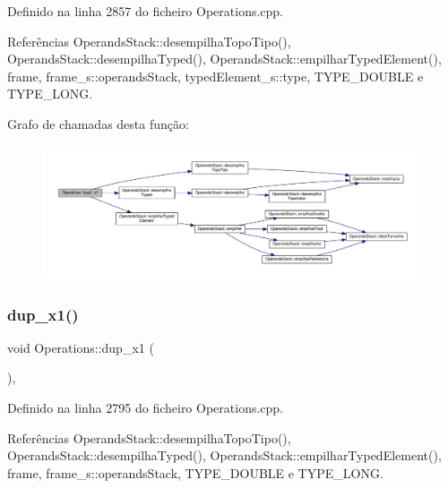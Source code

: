 Definido na linha 2857 do ficheiro Operations.\+cpp.



Referências Operands\+Stack\+::desempilha\+Topo\+Tipo(), Operands\+Stack\+::desempilha\+Typed(), Operands\+Stack\+::empilhar\+Typed\+Element(), frame, frame\+\_\+s\+::operands\+Stack, typed\+Element\+\_\+s\+::type, T\+Y\+P\+E\+\_\+\+D\+O\+U\+B\+LE e T\+Y\+P\+E\+\_\+\+L\+O\+NG.

Grafo de chamadas desta função\+:\nopagebreak
\begin{figure}[H]
\begin{center}
\leavevmode
\includegraphics[width=350pt]{classOperations_ab49247b3958376b27e8347e053dfe7de_cgraph}
\end{center}
\end{figure}
\mbox{\label{classOperations_a46bab81a4a4bd1eda1c89b0b74f9e014}} 
\subsubsection{\texorpdfstring{dup\+\_\+x1()}{dup\_x1()}}
{\footnotesize\ttfamily void Operations\+::dup\+\_\+x1 (\begin{DoxyParamCaption}{ }\end{DoxyParamCaption})\hspace{0.3cm}{\ttfamily [static]}, {\ttfamily [private]}}



Definido na linha 2795 do ficheiro Operations.\+cpp.



Referências Operands\+Stack\+::desempilha\+Topo\+Tipo(), Operands\+Stack\+::desempilha\+Typed(), Operands\+Stack\+::empilhar\+Typed\+Element(), frame, frame\+\_\+s\+::operands\+Stack, T\+Y\+P\+E\+\_\+\+D\+O\+U\+B\+LE e T\+Y\+P\+E\+\_\+\+L\+O\+NG.

